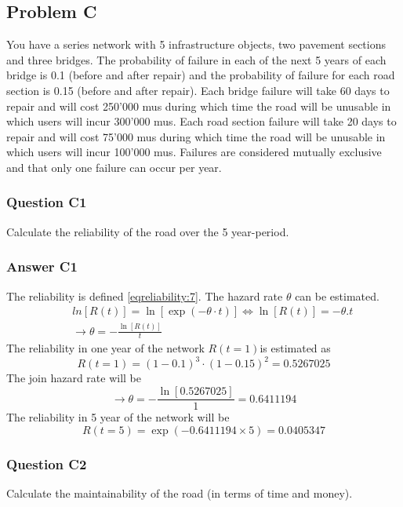 \subsection{Problem C}
You have a series network with 5 infrastructure objects, two pavement sections
and three bridges. The probability of failure in each of the next 5 years of each
bridge is 0.1 (before and after repair) and the probability of failure for each
road section is 0.15 (before and after repair). Each bridge failure will take 60
days to repair and will cost 250'000 mus during which time the road will be
unusable in which users will incur 300'000 mus.  Each road section failure will
take 20 days to repair and will cost 75'000 mus during which time the road will
be unusable in which users will incur 100'000 mus. Failures are considered
mutually exclusive and that only one failure can occur per year.
\subsubsection{Question C1}
Calculate the reliability of the road over the 5 year-period.
\subsubsection{Answer C1}
The reliability is defined \eqref{eqreliability:7}. The hazard rate $\theta$ can be estimated.
%
\begin{eqnarray}
&& ln[R(t)] = \ln [\exp ( - \theta  \cdot t)] \Leftrightarrow \ln [R(t)] =  -
\theta .t
\label{eq-reliability-a21} \\
&& \to \theta  =  - \frac{{\ln [R(t)]}}{t}
\label{eq-reliability-a22}
\end{eqnarray}
The reliability in one year of the network $R(t = 1)$is estimated as
\[
R(t = 1) = (1-0.1)^3 \cdot  (1-0.15)^2 = 0.5267025
\]
The join hazard rate will be 
\[
\to \theta  =  - \frac{{\ln [0.5267025]}}{1} = 0.6411194
\]
The reliability in 5 year of the network will be
\[
R(t = 5) = \exp ( - 0.6411194 \times 5) = 0.0405347
\]
\subsubsection{Question C2}
Calculate the maintainability of the road (in terms of time and money).
